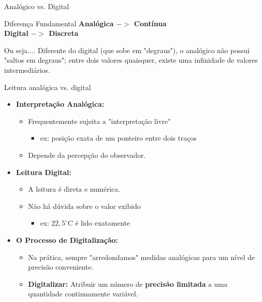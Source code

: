 \begin{frame}{Analógico vs. Digital}


    \begin{block}{Diferença Fundamental}
        \centering
        \textbf{Analógica $->$ Contínua} \\
        \textbf{Digital $->$ Discreta}
    \end{block}

    \begin{block}{Ou seja....}
        Diferente do digital (que sobe em "degraus"), o analógico não possui "saltos em degraus"; entre dois valores quaisquer, existe uma infinidade de valores intermediários.
    \end{block}
\end{frame}

\begin{frame}{Leitura analógica vs. digital}
    \begin{itemize}
        \item \textbf{Interpretação Analógica:}
              \begin{itemize}
                  \item Frequentemente sujeita a "interpretação livre"
                        \begin{itemize}
                            \item ex: posição exata de um ponteiro entre dois traços
                        \end{itemize}
                  \item Depende da percepção do observador.
              \end{itemize}
        \item \textbf{Leitura Digital:}
              \begin{itemize}
                  \item A leitura é direta e numérica.
                  \item Não há dúvida sobre o valor exibido
                        \begin{itemize}
                            \item ex: $22,5^{\circ}\text{C}$ é lido exatamente
                        \end{itemize}
              \end{itemize}
        \item \textbf{O Processo de Digitalização:}
              \begin{itemize}
                  \item Na prática, sempre "arredondamos" medidas analógicas para um nível de precisão conveniente.
                  \item \textbf{Digitalizar:} Atribuir um número de \textbf{precisão limitada} a uma quantidade continuamente variável.
              \end{itemize}
    \end{itemize}
\end{frame}

